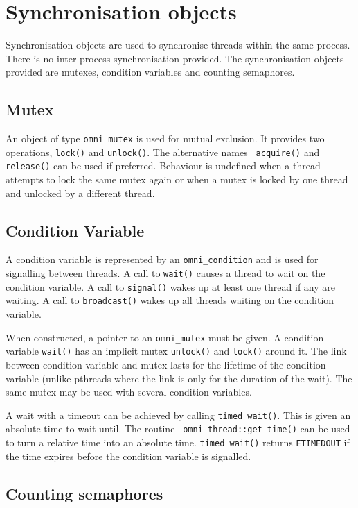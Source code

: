 \documentclass[11pt]{article}
\begin{document}
\section{Synchronisation objects}

Synchronisation objects are used to synchronise threads within the same
process.  There is no inter-process synchronisation provided.  The
synchronisation objects provided are mutexes, condition variables and counting
semaphores.

\subsection{Mutex}

An object of type {\tt omni\_mutex} is used for mutual exclusion.  It provides
two operations, {\tt lock()} and {\tt unlock()}.  The alternative names {\tt
acquire()} and {\tt release()} can be used if preferred.  Behaviour is
undefined when a thread attempts to lock the same mutex again or when a mutex
is locked by one thread and unlocked by a different thread.


\subsection{Condition Variable}

A condition variable is represented by an {\tt omni\_condition} and is used for
signalling between threads.  A call to {\tt wait()} causes a thread to wait on
the condition variable.  A call to {\tt signal()} wakes up at least one thread
if any are waiting.  A call to {\tt broadcast()} wakes up all threads waiting
on the condition variable.

When constructed, a pointer to an {\tt omni\_mutex} must be given.  A condition
variable {\tt wait()} has an implicit mutex {\tt unlock()} and {\tt lock()}
around it.  The link between condition variable and mutex lasts for the
lifetime of the condition variable (unlike pthreads where the link is only for
the duration of the wait).  The same mutex may be used with several condition
variables.

A wait with a timeout can be achieved by calling {\tt timed\_wait()}.  This is
given an absolute time to wait until.  The routine {\tt
omni\_thread::get\_time()} can be used to turn a relative time into an absolute
time.  {\tt timed\_wait()} returns {\tt ETIMEDOUT} if the time expires before
the condition variable is signalled.


\subsection{Counting semaphores}
\end{document}
